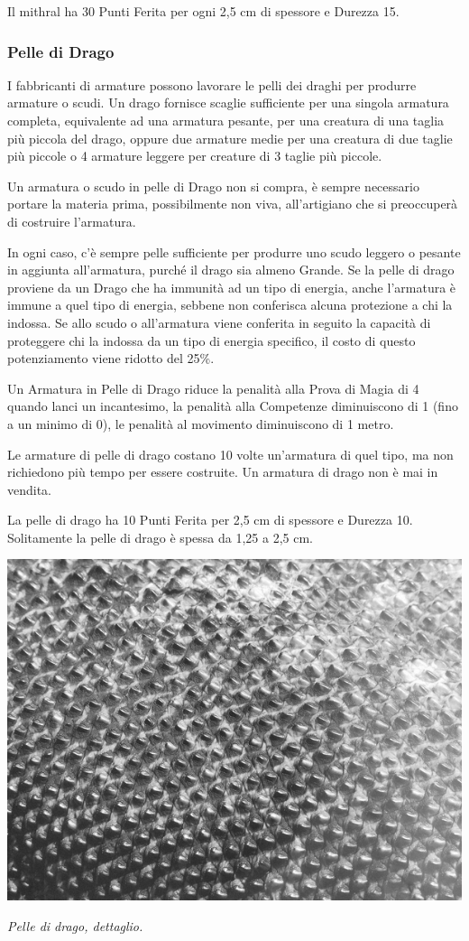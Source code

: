 \begin{multicols}{2}
Il mithral ha 30 Punti Ferita per ogni 2,5 cm di spessore e Durezza 15.

\subsubsection{Pelle di Drago}

\label{pelle-di-drago}

I fabbricanti di armature possono lavorare le pelli dei draghi per produrre armature o scudi.
Un drago fornisce scaglie sufficiente per una singola armatura completa, equivalente ad una armatura pesante, per una creatura di una taglia più piccola del drago, oppure due armature medie per una creatura di due taglie più piccole o 4 armature leggere per creature di 3 taglie più piccole.

Un armatura o scudo in pelle di Drago non si compra, è sempre necessario portare la materia prima, possibilmente non viva, all'artigiano che si preoccuperà di costruire l'armatura.

In ogni caso, c'è sempre pelle sufficiente per produrre uno scudo leggero o pesante in aggiunta all'armatura, purché il drago sia almeno Grande.
Se la pelle di drago proviene da un Drago che ha immunità ad un tipo di energia, anche l'armatura è immune a quel tipo di energia, sebbene non conferisca alcuna protezione a chi la indossa. Se allo scudo o all'armatura viene conferita in seguito la capacità di proteggere chi la indossa da un tipo di energia specifico, il costo di questo potenziamento viene ridotto del 25\%.

Un Armatura in Pelle di Drago riduce la penalità alla Prova di Magia di 4 quando lanci un  incantesimo, la penalità alla Competenze diminuiscono di 1 (fino a un minimo di 0), le penalità al movimento diminuiscono di 1 metro.

Le armature di pelle di drago costano 10 volte un'armatura di quel tipo, ma non richiedono più tempo per essere costruite. Un armatura di drago non è mai in vendita.

La pelle di drago ha 10 Punti Ferita per 2,5 cm di spessore e Durezza 10. Solitamente la pelle di drago è spessa da 1,25 a 2,5 cm.

\end{multicols}

\vfill

\begin{center}
\includegraphics[width=0.6\linewidth]{immagini/dragonhide.png}

\emph{Pelle di drago, dettaglio.}
\end{center}

\pagebreak

